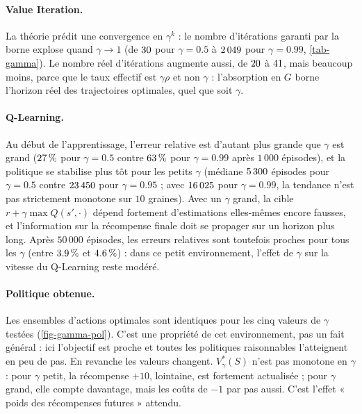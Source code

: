 \paragraph{Value Iteration.} La théorie prédit une convergence en $\gamma^k$ : le nombre d'itérations garanti par la borne explose quand $\gamma\to1$ (de $30$ pour $\gamma=0.5$ à $2\,049$ pour $\gamma=0.99$, \cref{tab-gamma}). Le nombre réel d'itérations augmente aussi, de $20$ à $41$, mais beaucoup moins, parce que le taux effectif est $\gamma\rho$ et non $\gamma$ : l'absorption en $G$ borne l'horizon réel des trajectoires optimales, quel que soit $\gamma$.

\paragraph{Q-Learning.} Au début de l'apprentissage, l'erreur relative est d'autant plus grande que $\gamma$ est grand ($27\,\%$ pour $\gamma=0.5$ contre $63\,\%$ pour $\gamma=0.99$ après $1\,000$ épisodes), et la politique se stabilise plus tôt pour les petits $\gamma$ (médiane $5\,300$ épisodes pour $\gamma=0.5$ contre $23\,450$ pour $\gamma=0.95$ ; avec $16\,025$ pour $\gamma=0.99$, la tendance n'est pas strictement monotone sur $10$ graines). Avec un $\gamma$ grand, la cible $r+\gamma\max Q(s',\cdot)$ dépend fortement d'estimations elles-mêmes encore fausses, et l'information sur la récompense finale doit se propager sur un horizon plus long. Après $50\,000$ épisodes, les erreurs relatives sont toutefois proches pour tous les $\gamma$ (entre $3.9\,\%$ et $4.6\,\%$) : dans ce petit environnement, l'effet de $\gamma$ sur la vitesse du Q-Learning reste modéré.

\paragraph{Politique obtenue.} Les ensembles d'actions optimales sont identiques pour les cinq valeurs de $\gamma$ testées (\cref{fig-gamma-pol}). C'est une propriété de cet environnement, pas un fait général : ici l'objectif est proche et toutes les politiques raisonnables l'atteignent en peu de pas. En revanche les valeurs changent. $V^*_\gamma(S)$ n'est pas monotone en $\gamma$ : pour $\gamma$ petit, la récompense $+10$, lointaine, est fortement actualisée ; pour $\gamma$ grand, elle compte davantage, mais les coûts de $-1$ par pas aussi. C'est l'effet « poids des récompenses futures » attendu.

